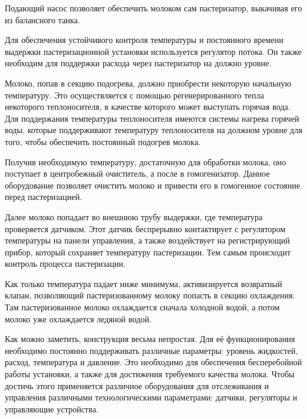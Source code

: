 {  \par \redline Подающий насос позволяет обеспечить молоком сам пастеризатор, выкачивая его из балансного танка.

  \par \redline Для обеспечения устойчивого контроля температуры и постоянного времени выдержки пастеризационной установки используется регулятор потока. Он также необходим для поддержки расхода через пастеризатор на должно уровне.

  \par \redline Молоко, попав в секцию подогрева, должно приобрести некоторую начальную температуру. Это осуществляется с помощью регенерированного тепла некоторого теплоносителя, в качестве которого может выступать горячая вода. Для поддержания температуры теплоносителя имеются системы нагрева горячей воды, которые поддерживают температуру теплоносителя на должном уровне для того, чтобы обеспечить постоянный подогрев молока.

  \par \redline Получив необходимую температуру, достаточную для обработки молока, оно поступает в центробежный очиститель, а после в гомогенизатор. Данное оборудование позволяет очистить молоко и привести его в гомогенное состояние перед пастеризацией.

  \par \redline Далее молоко попадает во внешнюю трубу выдержки, где температура проверяется датчиком. Этот датчик беспрерывно контактирует с регулятором температуры на панели управления, а также воздействует на регистрирующий прибор, который сохраняет температуру пастеризации. Тем самым происходит контроль процесса пастеризации.

  \par \redline Как только температура падает ниже минимума, активизируется возвратный клапан, позволяющий пастеризованному молоку попасть в секцию охлаждения. Там пастеризованное молоко охлаждается сначала холодной водой, а потом молоко уже охлаждается ледяной водой.

  \par \redline Как можно заметить, конструкция весьма непростая. Для её функционирования необходимо постоянно поддерживать различные параметры: уровень жидкостей, расход, температура и давление. Это необходимо для обеспечения бесперебойной работы установки, а также для достижения требуемого качества молока. Чтобы достичь этого применяется различное оборудования для отслеживания и управления различными технологическими параметрами: датчики, регуляторы и управляющие устройства.

}
